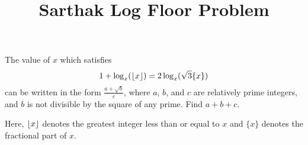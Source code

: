\documentclass[11pt]{scrartcl}
\title{Sarthak Log Floor Problem}
\begin{document}
The value of $x$ which satisfies
\[1 + \log_{x}(\left\lfloor x \right\rfloor) = 2\log_{x}(\sqrt{3}\{x\})\]
can be written in the form $\frac{a + \sqrt{b}}{c}$, where $a$, $b$, and $c$ are relatively prime integers, and $b$ is not divisible by the square of any prime. Find $a + b + c$.

Here, $\left\lfloor x \right\rfloor$ denotes the greatest integer less than or equal to $x$ and $\{x\}$ denotes the fractional part of $x$.
\end{document}
